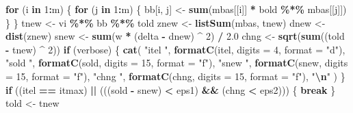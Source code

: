 \documentclass[
  12pt,
]{article}
\newenvironment{Shaded}{\begin{snugshade}}{\end{snugshade}}
\newcommand{\AttributeTok}[1]{\textcolor[rgb]{0.13,0.29,0.53}{#1}}
\newcommand{\ControlFlowTok}[1]{\textcolor[rgb]{0.13,0.29,0.53}{\textbf{#1}}}
\newcommand{\DecValTok}[1]{\textcolor[rgb]{0.00,0.00,0.81}{#1}}
\newcommand{\FloatTok}[1]{\textcolor[rgb]{0.00,0.00,0.81}{#1}}
\newcommand{\FunctionTok}[1]{\textcolor[rgb]{0.13,0.29,0.53}{\textbf{#1}}}
\newcommand{\NormalTok}[1]{#1}
\newcommand{\OtherTok}[1]{\textcolor[rgb]{0.56,0.35,0.01}{#1}}
\newcommand{\SpecialCharTok}[1]{\textcolor[rgb]{0.81,0.36,0.00}{\textbf{#1}}}
\newcommand{\StringTok}[1]{\textcolor[rgb]{0.31,0.60,0.02}{#1}}
\begin{document}
\begin{Shaded}
\begin{Highlighting}[]
      \ControlFlowTok{for}\NormalTok{ (i }\ControlFlowTok{in} \DecValTok{1}\SpecialCharTok{:}\NormalTok{m) \{}
        \ControlFlowTok{for}\NormalTok{ (j }\ControlFlowTok{in} \DecValTok{1}\SpecialCharTok{:}\NormalTok{m) \{}
\NormalTok{          bb[i, j] }\OtherTok{\textless{}{-}} \FunctionTok{sum}\NormalTok{(mbas[[i]] }\SpecialCharTok{*}\NormalTok{ bold }\SpecialCharTok{\%*\%}\NormalTok{ mbas[[j]])}
\NormalTok{        \}}
\NormalTok{      \}}
\NormalTok{      tnew }\OtherTok{\textless{}{-}}\NormalTok{ vi }\SpecialCharTok{\%*\%}\NormalTok{ bb }\SpecialCharTok{\%*\%}\NormalTok{ told}
\NormalTok{      znew }\OtherTok{\textless{}{-}} \FunctionTok{listSum}\NormalTok{(mbas, tnew)}
\NormalTok{      dnew }\OtherTok{\textless{}{-}} \FunctionTok{dist}\NormalTok{(znew)}
\NormalTok{      snew }\OtherTok{\textless{}{-}} \FunctionTok{sum}\NormalTok{(w }\SpecialCharTok{*}\NormalTok{ (delta }\SpecialCharTok{{-}}\NormalTok{ dnew) }\SpecialCharTok{\^{}} \DecValTok{2}\NormalTok{) }\SpecialCharTok{/} \FloatTok{2.0}
\NormalTok{      chng }\OtherTok{\textless{}{-}} \FunctionTok{sqrt}\NormalTok{(}\FunctionTok{sum}\NormalTok{((told }\SpecialCharTok{{-}}\NormalTok{ tnew) }\SpecialCharTok{\^{}} \DecValTok{2}\NormalTok{))}
      \ControlFlowTok{if}\NormalTok{ (verbose) \{}
        \FunctionTok{cat}\NormalTok{(}
          \StringTok{"itel "}\NormalTok{,}
          \FunctionTok{formatC}\NormalTok{(itel, }\AttributeTok{digits =} \DecValTok{4}\NormalTok{, }\AttributeTok{format =} \StringTok{"d"}\NormalTok{),}
          \StringTok{"sold "}\NormalTok{,}
          \FunctionTok{formatC}\NormalTok{(sold, }\AttributeTok{digits =} \DecValTok{15}\NormalTok{, }\AttributeTok{format =} \StringTok{"f"}\NormalTok{),}
          \StringTok{"snew "}\NormalTok{,}
          \FunctionTok{formatC}\NormalTok{(snew, }\AttributeTok{digits =} \DecValTok{15}\NormalTok{, }\AttributeTok{format =} \StringTok{"f"}\NormalTok{),}
          \StringTok{"chng "}\NormalTok{,}
          \FunctionTok{formatC}\NormalTok{(chng, }\AttributeTok{digits =} \DecValTok{15}\NormalTok{, }\AttributeTok{format =} \StringTok{"f"}\NormalTok{),}
          \StringTok{"}\SpecialCharTok{\textbackslash{}n}\StringTok{"}
\NormalTok{        )}
\NormalTok{      \}}
      \ControlFlowTok{if}\NormalTok{ ((itel }\SpecialCharTok{==}\NormalTok{ itmax) }\SpecialCharTok{||}\NormalTok{ (((sold }\SpecialCharTok{{-}}\NormalTok{ snew) }\SpecialCharTok{\textless{}}\NormalTok{ eps1) }\SpecialCharTok{\&\&}\NormalTok{ (chng }\SpecialCharTok{\textless{}}\NormalTok{ eps2))) \{}
        \ControlFlowTok{break}
\NormalTok{      \}}
\NormalTok{      told }\OtherTok{\textless{}{-}}\NormalTok{ tnew }

\end{Highlighting}
\end{Shaded}
\end{document}
